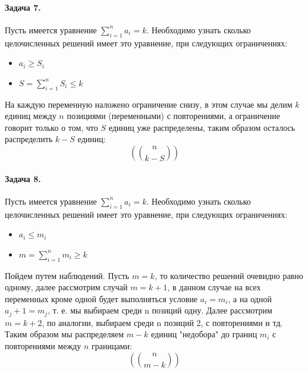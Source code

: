 \documentclass[a4paper,12pt]{article}
\begin{document}
\paragraph{Задача 7.} Пусть имеется уравнение $\sum_{i=1}^{n} a_i = k$. Необходимо узнать сколько целочисленных решений имеет это уравнение, при следующих ограничениях:
\begin{itemize}
\item $a_i \ge S_i$

\item $S = \sum_{i=1}^{n} S_i \le k$
\end{itemize}
\begin{Solution}
На каждую переменную наложено ограничение снизу, в этом случае мы делим $k$ единиц между $n$ позициями (переменными) с повторениями, а ограничение говорит только о том, что $S$ единиц уже распределены, таким образом осталось распределить $k-S$ единиц:
\[
	\left( \binom{n}{k-S} \right)
\]
\end{Solution}

\paragraph{Задача 8. } Пусть имеется уравнение $\sum_{i=1}^{n} a_i = k$. Необходимо узнать сколько целочисленных решений имеет это уравнение, при следующих ограничениях:
\begin{itemize}
\item $a_i \le m_i$

\item $m = \sum_{i=1}^{n} m_i \ge k$
\end{itemize}
\begin{Solution}
Пойдем путем наблюдений. Пусть $m=k$, то количество решений очевидно равно одному, далее рассмотрим случай $m=k+1$, в данном случае на всех переменных кроме одной будет выполняться условие $a_i = m_i$, а на одной $a_j + 1 = m_j$, т. е. мы выбираем среди n позиций одну. Далее рассмотрим $m=k+2$, по аналогии, выбираем среди n позиций 2, с повторениями и тд. Таким образом мы распределяем $m-k$ единиц "недобора" до границ $m_i$ с повторениями между $n$ границами:
\[
	\left(\binom{n}{m-k}\right)
\] 
\end{Solution}
\end{document}
